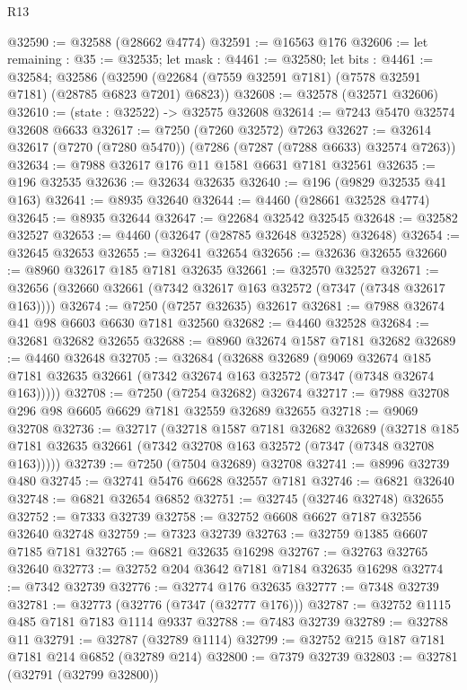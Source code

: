 \begin{lexlean}{R13}
\begin{coremodule}
@32590 := @32588 (@28662 @4774)
@32591 := @16563 @176
@32606 := let remaining : @35 := @32535;
  let mask : @4461 := @32580;
  let bits : @4461 := @32584;
  @32586 (@32590 (@22684 (@7559 @32591 @7181) (@7578 @32591 @7181) (@28785 @6823 @7201) @6823))
@32608 := @32578 (@32571 @32606)
@32610 := (state : @32522) -> @32575 @32608
@32614 := @7243 @5470 @32574 @32608 @6633
@32617 := @7250 (@7260 @32572) @7263
@32627 := @32614 @32617 (@7270 (@7280 @5470)) (@7286 (@7287 (@7288 @6633) @32574 @7263))
@32634 := @7988 @32617 @176 @11 @1581 @6631 @7181 @32561
@32635 := @196 @32535
@32636 := @32634 @32635
@32640 := @196 (@9829 @32535 @41 @163)
@32641 := @8935 @32640
@32644 := @4460 (@28661 @32528 @4774)
@32645 := @8935 @32644
@32647 := @22684 @32542 @32545
@32648 := @32582 @32527
@32653 := @4460 (@32647 (@28785 @32648 @32528) @32648)
@32654 := @32645 @32653
@32655 := @32641 @32654
@32656 := @32636 @32655
@32660 := @8960 @32617 @185 @7181 @32635
@32661 := @32570 @32527
@32671 := @32656 (@32660 @32661 (@7342 @32617 @163 @32572 (@7347 (@7348 @32617 @163))))
@32674 := @7250 (@7257 @32635) @32617
@32681 := @7988 @32674 @41 @98 @6603 @6630 @7181 @32560
@32682 := @4460 @32528
@32684 := @32681 @32682 @32655
@32688 := @8960 @32674 @1587 @7181 @32682
@32689 := @4460 @32648
@32705 := @32684
    (@32688
      @32689
      (@9069
        @32674
        @185
        @7181
        @32635
        @32661
        (@7342 @32674 @163 @32572 (@7347 (@7348 @32674 @163)))))
@32708 := @7250 (@7254 @32682) @32674
@32717 := @7988 @32708 @296 @98 @6605 @6629 @7181 @32559 @32689 @32655
@32718 := @9069 @32708
@32736 := @32717
    (@32718
      @1587
      @7181
      @32682
      @32689
      (@32718 @185 @7181 @32635 @32661 (@7342 @32708 @163 @32572 (@7347 (@7348 @32708 @163)))))
@32739 := @7250 (@7504 @32689) @32708
@32741 := @8996 @32739 @480
@32745 := @32741 @5476 @6628 @32557 @7181
@32746 := @6821 @32640
@32748 := @6821 @32654 @6852
@32751 := @32745 (@32746 @32748) @32655
@32752 := @7333 @32739
@32758 := @32752 @6608 @6627 @7187 @32556 @32640 @32748
@32759 := @7323 @32739
@32763 := @32759 @1385 @6607 @7185 @7181
@32765 := @6821 @32635 @16298
@32767 := @32763 @32765 @32640
@32773 := @32752 @204 @3642 @7181 @7184 @32635 @16298
@32774 := @7342 @32739
@32776 := @32774 @176 @32635
@32777 := @7348 @32739
@32781 := @32773 (@32776 (@7347 (@32777 @176)))
@32787 := @32752 @1115 @485 @7181 @7183 @1114 @9337
@32788 := @7483 @32739
@32789 := @32788 @11
@32791 := @32787 (@32789 @1114)
@32799 := @32752 @215 @187 @7181 @7181 @214 @6852 (@32789 @214)
@32800 := @7379 @32739
@32803 := @32781 (@32791 (@32799 @32800))

\end{coremodule}
\end{lexlean}
